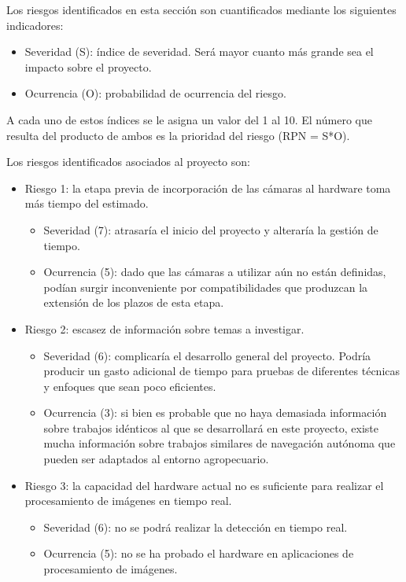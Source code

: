 \documentclass[
11pt, %
codirector, %
]{charter}
\begin{document}
Los riesgos identificados en esta sección son cuantificados mediante los siguientes indicadores:

\begin{itemize}
    \item Severidad (S): índice de severidad. Será mayor cuanto más grande sea el impacto sobre el proyecto.
    \item Ocurrencia (O): probabilidad de ocurrencia del riesgo.
\end{itemize}
	
A cada uno de estos índices se le asigna un valor del 1 al 10. El número que resulta del producto de ambos es la prioridad del riesgo (RPN = S*O).

Los riesgos identificados asociados al proyecto son:

\begin{itemize}
	\item Riesgo 1: la etapa previa de incorporación de las cámaras al hardware toma más tiempo del estimado.
	\begin{itemize}
		\item Severidad (7): atrasaría el inicio del proyecto y alteraría la gestión de tiempo.
		\item Ocurrencia (5): dado que las cámaras a utilizar aún no están definidas, podían surgir inconveniente por compatibilidades que produzcan la extensión de los plazos de esta etapa. 
	\end{itemize}
	
	\item Riesgo 2: escasez de información sobre temas a investigar.
	\begin{itemize}
		\item Severidad (6): complicaría el desarrollo general del proyecto. Podría producir un gasto adicional de tiempo para pruebas de diferentes técnicas y enfoques que sean poco eficientes.
		\item Ocurrencia (3): si bien es probable que no haya demasiada información sobre trabajos idénticos al que se desarrollará en este proyecto, existe mucha información sobre trabajos similares de navegación autónoma que pueden ser adaptados al entorno agropecuario.
	\end{itemize}
	
	\item Riesgo 3: la capacidad del hardware actual no es suficiente para realizar el procesamiento de imágenes en tiempo real.
	\begin{itemize}
		\item Severidad (6): no se podrá realizar la detección en tiempo real.
		\item Ocurrencia (5): no se ha probado el hardware en aplicaciones de procesamiento de imágenes.
	\end{itemize}
	

\end{itemize}
\end{document}
